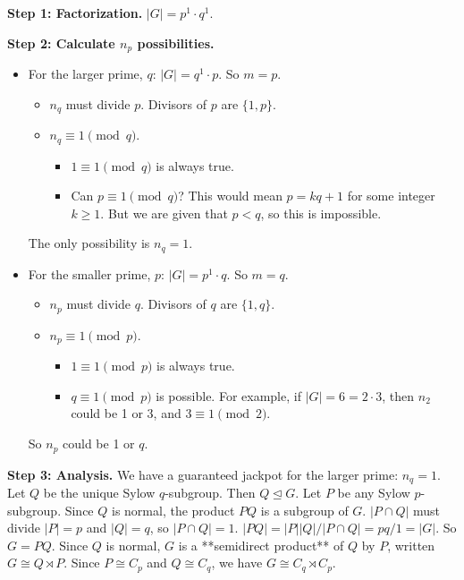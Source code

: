 \documentclass[12pt,a4paper]{article}
\theoremstyle{plain} %
\theoremstyle{definition} %
\theoremstyle{remark} %
\begin{document}
\textbf{Step 1: Factorization.} $|G|=p^1 \cdot q^1$.

\textbf{Step 2: Calculate $n_p$ possibilities.}
\begin{itemize}
    \item For the larger prime, $q$: $|G|=q^1 \cdot p$. So $m=p$.
        \begin{itemize}
            \item $n_q$ must divide $p$. Divisors of $p$ are $\{1, p\}$.
            \item $n_q \equiv 1 \pmod{q}$.
                \begin{itemize}
                    \item $1 \equiv 1 \pmod{q}$ is always true.
                    \item Can $p \equiv 1 \pmod{q}$? This would mean $p = kq+1$ for some integer $k \ge 1$. But we are given that $p < q$, so this is impossible.
                \end{itemize}
        \end{itemize}
        The only possibility is $n_q=1$.

    \item For the smaller prime, $p$: $|G|=p^1 \cdot q$. So $m=q$.
        \begin{itemize}
            \item $n_p$ must divide $q$. Divisors of $q$ are $\{1, q\}$.
            \item $n_p \equiv 1 \pmod{p}$.
                \begin{itemize}
                    \item $1 \equiv 1 \pmod{p}$ is always true.
                    \item $q \equiv 1 \pmod{p}$ is possible. For example, if $|G|=6=2 \cdot 3$, then $n_2$ could be 1 or 3, and $3 \equiv 1 \pmod{2}$.
                \end{itemize}
        \end{itemize}
        So $n_p$ could be 1 or $q$.
\end{itemize}

\textbf{Step 3: Analysis.}
We have a guaranteed jackpot for the larger prime: $n_q=1$. Let $Q$ be the unique Sylow $q$-subgroup. Then $Q \unlhd G$.
Let $P$ be any Sylow $p$-subgroup. Since $Q$ is normal, the product $PQ$ is a subgroup of $G$.
$|P \cap Q|$ must divide $|P|=p$ and $|Q|=q$, so $|P \cap Q|=1$.
$|PQ| = |P||Q|/|P \cap Q| = pq/1 = |G|$. So $G=PQ$.
Since $Q$ is normal, $G$ is a **semidirect product** of $Q$ by $P$, written $G \cong Q \rtimes P$.
Since $P \cong C_p$ and $Q \cong C_q$, we have $G \cong C_q \rtimes C_p$.
\end{document}
